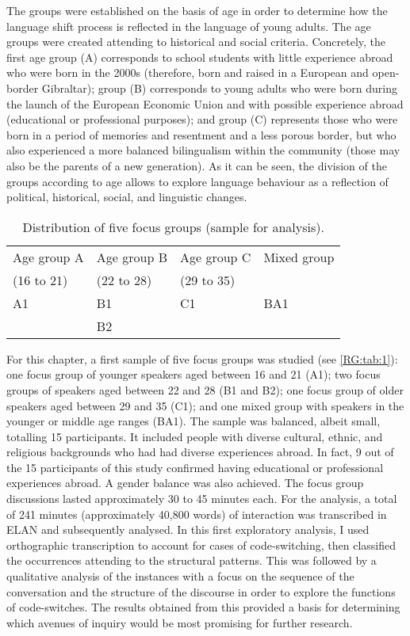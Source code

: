 \documentclass[output=paper]{langscibook}
\begin{document}
The groups were established on the basis of age in order to determine how the language shift process is reflected in the language of young adults. The age groups were created attending to historical and social criteria. Concretely, the first age group (A) corresponds to school students with little experience abroad who were born in the 2000s (therefore, born and raised in a European and open-border Gibraltar); group (B) corresponds to young adults who were born during the launch of the European Economic Union and with possible experience abroad (educational or professional purposes); and group (C) represents those who were born in a period of memories and resentment and a less porous border, but who also experienced a more balanced bilingualism within the community (those may also be the parents of a new generation). As it can be seen, the division of the groups according to age allows to explore language behaviour as a reflection of political, historical, social, and linguistic changes.


\begin{table}[h]
  \begin{tabularx}{\textwidth}{XXXl}\midrule\toprule
Age group A &Age group B 	&
Age group C 	&Mixed group\\ 
(16 to 21)	&(22 to 28) &(29 to 35)\\
\midrule
A1 &	B1 &	C1&	BA1\\
&	B2 		\\
 \bottomrule\midrule
  \end{tabularx}  \caption{Distribution of five focus groups (sample for analysis).}
  \label{RG:tab:1}
\end{table}


For this chapter, a first sample of five focus groups was studied (see \autoref{RG:tab:1}): one focus group of younger speakers aged between 16 and 21 (A1); two focus groups of speakers aged between 22 and 28 (B1 and B2); one focus group of older speakers aged between 29 and 35 (C1); and one mixed group with speakers in the younger or middle age ranges (BA1). The sample was balanced, albeit small, totalling 15 participants. It included people with diverse cultural, ethnic, and religious backgrounds who had had diverse experiences abroad. In fact, 9 out of the 15 participants of this study confirmed having educational or professional experiences abroad. A gender balance was also achieved. The focus group discussions lasted approximately 30 to 45 minutes each. For the analysis, a total of 241 minutes (approximately 40,800 words) of interaction was transcribed in ELAN and subsequently analysed. In this first exploratory analysis, I used orthographic transcription to account for cases of code-switching, then classified the occurrences attending to the structural patterns. This was followed by a qualitative analysis of the instances with a focus on the sequence of the conversation and the structure of the discourse in order to explore the functions of code-switches. The results obtained from this provided a basis for determining which avenues of inquiry would be most promising for further research.
\end{document}

